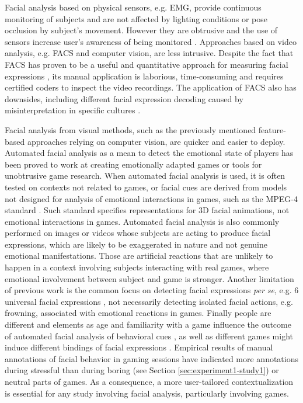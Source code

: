Facial analysis based on physical sensors, e.g. EMG, provide continuous monitoring of subjects and are not affected by lighting conditions or pose occlusion by subject's movement. However they are obtrusive and the use of sensors increase user's awareness of being monitored \parencite{yamakoshi2007preliminary,yamaguchi2006evaluation,healey2005detecting}. Approaches based on video analysis, e.g. FACS and computer vision, are less intrusive. Despite the fact that FACS has proven to be a useful and quantitative approach for measuring facial expressions \parencite{bartlett1999measuring}, its manual application is laborious, time-consuming and requires certified coders to inspect the video recordings. The application of FACS also has downsides, including different facial expression decoding caused by misinterpretation in specific cultures \parencite{jack2013culture}.

Facial analysis from visual methods, such as the previously mentioned feature-based approaches relying on computer vision, are quicker and easier to deploy. Automated facial analysis as a mean to detect the emotional state of players has been proved to work at creating emotionally adapted games \parencite{saari2004towards} or tools for unobtrusive game research. When automated facial analysis is used, it is often tested on contexts not related to games, or facial cues are derived from models not designed for analysis of emotional interactions in games, such as the MPEG-4 standard \parencite{abrantes1999mpeg}. Such standard specifies representations for 3D facial animations, not emotional interactions in games. Automated facial analysis is also commonly performed on images or videos whose subjects are acting to produce facial expressions, which are likely to be exaggerated in nature and not genuine emotional manifestations. Those are artificial reactions that are unlikely to happen in a context involving subjects interacting with real games, where emotional involvement between subject and game is stronger. Another limitation of previous work is the common focus on detecting facial expressions \textit{per se}, e.g. 6 universal facial expressions \parencite{ekman1971constants}, not necessarily detecting isolated facial actions, e.g. frowning, associated with emotional reactions in games. Finally people are different and elements as age and familiarity with a game influence the outcome of automated facial analysis of behavioral cues \parencite{asteriadis2012towards}, as well as different games might induce different bindings of facial expressions \parencite{tan2014correlation}. Empirical results of manual annotations of facial behavior in gaming sessions have indicated more annotations during stressful than during boring (see Section \ref{sec:experiment1-study1}) or neutral \parencite{kaiser1994multi} parts of games. As a consequence, a more user-tailored contextualization is essential for any study involving facial analysis, particularly involving games.

